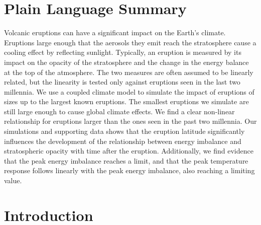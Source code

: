 \documentclass[draft]{agujournal2019}
\begin{document}
\section*{Plain Language Summary}


Volcanic eruptions can have a significant impact on the Earth's climate. Eruptions large
enough that the aerosols they emit reach the stratosphere cause a cooling effect by
reflecting sunlight. Typically, an eruption is measured by its impact on the opacity of
the stratosphere and the change in the energy balance at the top of the atmosphere. The
two measures are often assumed to be linearly related, but the linearity is tested only
against eruptions seen in the last two millennia. We use a coupled climate model to
simulate the impact of eruptions of sizes up to the largest known eruptions. The
smallest eruptions we simulate are still large enough to cause global climate effects.
We find a clear non-linear relationship for eruptions larger than the ones seen in the
past two millennia. Our simulations and supporting data shows that the eruption latitude
significantly influences the development of the relationship between energy imbalance
and stratospheric opacity with time after the eruption. Additionally, we find evidence
that the peak energy imbalance reaches a limit, and that the peak temperature response
follows linearly with the peak energy imbalance, also reaching a limiting value.


\section{Introduction}

\end{document}
